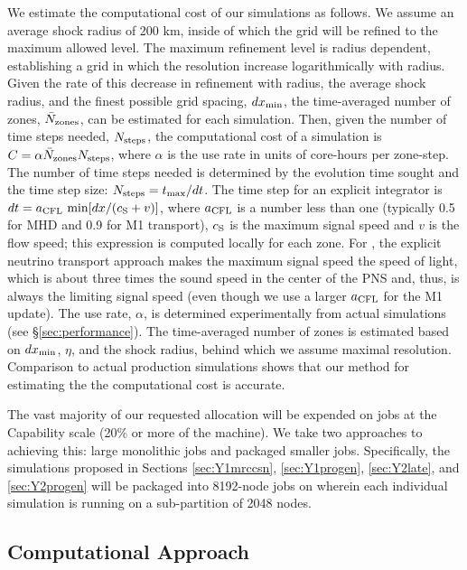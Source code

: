 We estimate the computational cost of our
simulations as follows.  We
assume an average shock radius of 200 km, inside of which the grid
will be refined to the maximum allowed level.
The maximum refinement level is radius dependent, establishing a grid in which the resolution increase logarithmically with radius.
Given the rate of this decrease in refinement with radius, the
average shock radius, and the finest possible grid spacing, $d
x_{\rm min}$, the time-averaged number of zones, $\bar N_{\rm zones}$,
can be estimated for each simulation.  Then, given the number of time
steps needed, $N_{\rm steps}$, the computational cost of a simulation
is $C = \alpha   \bar N_{\rm zones} N_{\rm steps}$,
where $\alpha$ is the use rate in units of core-hours per zone-step.
The number of time steps needed is determined by the
evolution time sought and the time step size: $N_{\rm steps} = t_{\rm
  max} / d t$.
The time step for an explicit integrator is $d t = a_{\rm CFL}\ {\rm min}[d x / (c_{\rm S} + v)]$, where $a_{\rm CFL}$ is a number less than one (typically 0.5 for MHD and 0.9 for M1 transport), $c_{\rm S}$ is the maximum signal speed and $v$ is the flow speed; this expression is computed locally for each zone.
For \sparkmone, the explicit neutrino transport approach makes the maximum signal speed the speed of light, which is about three times the sound speed in the center of the PNS and, thus, is always the limiting signal speed (even though we use a larger $a_{\rm CFL}$ for the M1 update).
The use rate, $\alpha$, is determined experimentally from actual simulations (see \S\ref{sec:performance}).  The time-averaged number of zones is estimated based on $d x_{\rm min}$, $\eta$, and the shock radius, behind which we assume maximal resolution.  Comparison to actual production simulations shows that our method for estimating the the computational cost is accurate.

The vast majority of our requested allocation will be expended on jobs at the Capability scale (20\% or more of the machine).
We take two approaches to achieving this: large monolithic jobs and packaged smaller jobs.
Specifically, the simulations proposed in Sections \ref{sec:Y1mrccsn}, \ref{sec:Y1progen}, \ref{sec:Y2late}, and \ref{sec:Y2progen} will be packaged into 8192-node jobs on \mira wherein each individual simulation is running on a sub-partition of 2048 nodes.


\subsection{Computational Approach}
\label{sec:approach}

